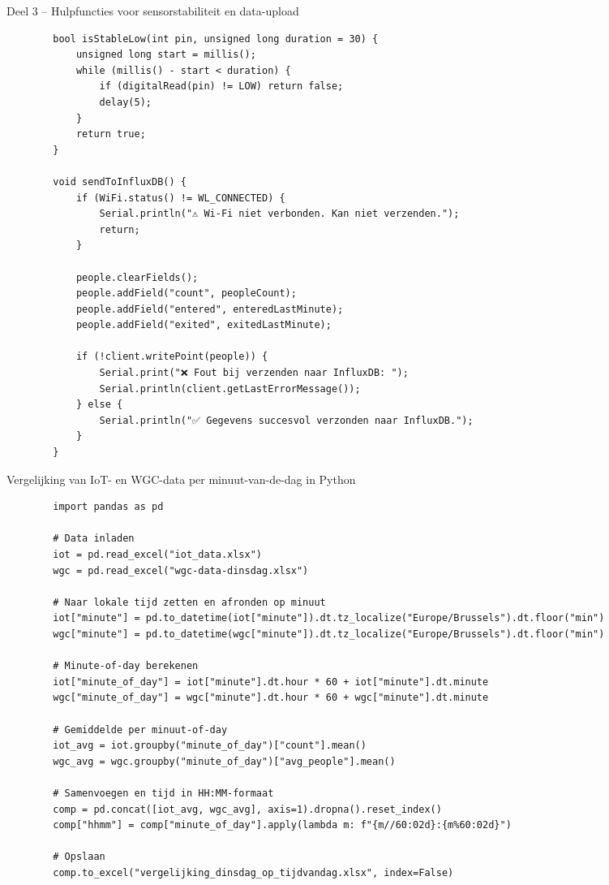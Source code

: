 \documentclass[dutch,dit,thesis]{hogentreport}
\begin{document}
\begin{listing}[H]
    \caption{Deel 3 – Hulpfuncties voor sensorstabiliteit en data-upload}
    \label{lst:esp32_utils}
    \begin{verbatim}
        bool isStableLow(int pin, unsigned long duration = 30) {
            unsigned long start = millis();
            while (millis() - start < duration) {
                if (digitalRead(pin) != LOW) return false;
                delay(5);
            }
            return true;
        }
        
        void sendToInfluxDB() {
            if (WiFi.status() != WL_CONNECTED) {
                Serial.println("⚠️ Wi-Fi niet verbonden. Kan niet verzenden.");
                return;
            }
            
            people.clearFields();
            people.addField("count", peopleCount);
            people.addField("entered", enteredLastMinute);
            people.addField("exited", exitedLastMinute);
            
            if (!client.writePoint(people)) {
                Serial.print("❌ Fout bij verzenden naar InfluxDB: ");
                Serial.println(client.getLastErrorMessage());
            } else {
                Serial.println("✅ Gegevens succesvol verzonden naar InfluxDB.");
            }
        }
    \end{verbatim}
\end{listing}

\begin{listing}[H]
    \caption{Vergelijking van IoT- en WGC-data per minuut-van-de-dag in Python}
    \label{lst:python-iot-wgc}
    \begin{verbatim}
        import pandas as pd
        
        # Data inladen
        iot = pd.read_excel("iot_data.xlsx")
        wgc = pd.read_excel("wgc-data-dinsdag.xlsx")
        
        # Naar lokale tijd zetten en afronden op minuut
        iot["minute"] = pd.to_datetime(iot["minute"]).dt.tz_localize("Europe/Brussels").dt.floor("min")
        wgc["minute"] = pd.to_datetime(wgc["minute"]).dt.tz_localize("Europe/Brussels").dt.floor("min")
        
        # Minute-of-day berekenen
        iot["minute_of_day"] = iot["minute"].dt.hour * 60 + iot["minute"].dt.minute
        wgc["minute_of_day"] = wgc["minute"].dt.hour * 60 + wgc["minute"].dt.minute
        
        # Gemiddelde per minuut-of-day
        iot_avg = iot.groupby("minute_of_day")["count"].mean()
        wgc_avg = wgc.groupby("minute_of_day")["avg_people"].mean()
        
        # Samenvoegen en tijd in HH:MM-formaat
        comp = pd.concat([iot_avg, wgc_avg], axis=1).dropna().reset_index()
        comp["hhmm"] = comp["minute_of_day"].apply(lambda m: f"{m//60:02d}:{m%60:02d}")
        
        # Opslaan
        comp.to_excel("vergelijking_dinsdag_op_tijdvandag.xlsx", index=False)
    \end{verbatim}
\end{listing}
\end{document}
